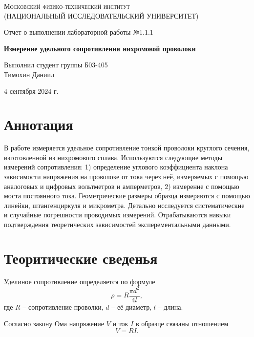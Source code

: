 \documentclass[12pt,a4paper]{article}
\def \TITLE {Отчет о выполнении лабораторной работы №1.1.1}
\def \SUBTITLE {Измерение удельного сопротивления нихромовой проволоки}
\def \AUTHOR {Выполнил студент группы Б03-405\\ Тимохин Даниил}
\def \DATE {4 сентября 2024 г.}
\begin{document}
\begin{titlepage}
	\centering
	\vspace{5cm}
	{\scshape\large Московский физико-технический институт \\
	(НАЦИОНАЛЬНЫЙ ИССЛЕДОВАТЕЛЬСКИЙ УНИВЕРСИТЕТ)}
	
	\vspace{4cm}
	{\LARGE \TITLE}
	
	\vspace{1cm}
	{\Huge\bf \SUBTITLE }
	
	\vspace{1cm}
	\vfill
	
\begin{flushright}
	{\LARGE \AUTHOR}
\end{flushright}
	

	\vfill

	\DATE
\end{titlepage}

\newpage

\fontsize{12}{14}\selectfont

\section{ Аннотация}
В работе измеряется удельное сопротивление тонкой проволоки круглого сечения, изготовленной из нихромового сплава. Используются следующие методы измерений сопротивления: 1) определение углового коэффициента наклона зависимости напряжения на проволоке от тока
через неё, измеряемых с помощью аналоговых и цифровых вольтметров и амперметров, 2) измерение с помощью моста постоянного тока. Геометрические размеры образца измеряются с
помощью линейки, штангенциркуля и микрометра. Детально исследуется систематические и
случайные погрешности проводимых измерений. Отрабатываются навыки подтверждения теоретических зависимостей эксперементальными данными.

\section{ Теоритические сведенья}
Уделиное сопротивление определяется по формуле
\begin{equation}\label{Rho_eq}
\rho = R \frac{\pi d^2}{4l},
\end{equation}
где $R$ -- сопротивление проволки,  $d$ -- её диаметр, $l$ -- длина.

Согласно закону Ома напряжение $V$ и ток $I$ в образце связаны отношением
\begin{equation}\label{Om_eq}
V = RI.
\end{equation}
\end{document}
